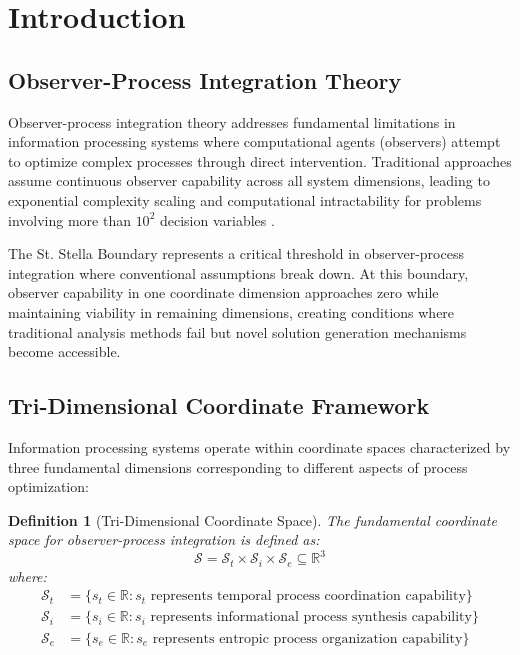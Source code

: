 \documentclass[12pt,a4paper]{article}
\newtheorem{definition}{Definition}
\begin{document}
\section{Introduction}

\subsection{Observer-Process Integration Theory}

Observer-process integration theory addresses fundamental limitations in information processing systems where computational agents (observers) attempt to optimize complex processes through direct intervention. Traditional approaches assume continuous observer capability across all system dimensions, leading to exponential complexity scaling and computational intractability for problems involving more than $10^2$ decision variables \cite{garey1979computers}.

The St. Stella Boundary represents a critical threshold in observer-process integration where conventional assumptions break down. At this boundary, observer capability in one coordinate dimension approaches zero while maintaining viability in remaining dimensions, creating conditions where traditional analysis methods fail but novel solution generation mechanisms become accessible.

\subsection{Tri-Dimensional Coordinate Framework}

Information processing systems operate within coordinate spaces characterized by three fundamental dimensions corresponding to different aspects of process optimization:

\begin{definition}[Tri-Dimensional Coordinate Space]
The fundamental coordinate space for observer-process integration is defined as:
\begin{equation}
\mathcal{S} = \mathcal{S}_t \times \mathcal{S}_i \times \mathcal{S}_e \subseteq \mathbb{R}^3
\end{equation}
where:
\begin{align}
\mathcal{S}_t &= \{s_t \in \mathbb{R} : s_t \text{ represents temporal process coordination capability}\} \\
\mathcal{S}_i &= \{s_i \in \mathbb{R} : s_i \text{ represents informational process synthesis capability}\} \\
\mathcal{S}_e &= \{s_e \in \mathbb{R} : s_e \text{ represents entropic process organization capability}\}
\end{align}
\end{definition}
\end{document}
